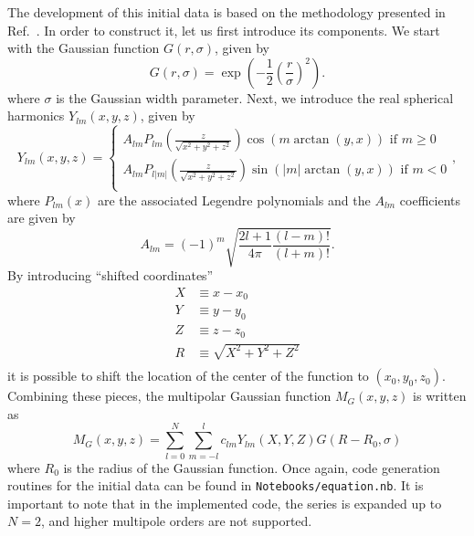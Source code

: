 The development of this initial data is based on the methodology presented in Ref.~\cite{PhysRevD.87.043513}. In order to construct it, let us first introduce its components. We start with the Gaussian function $G(r, \sigma)$, given by
%
\begin{equation}
  G(r, \sigma) = \exp\left( -\frac{1}{2} \left( \frac{r}{\sigma} \right)^2  \right).
  \label{eq:wave_scattering_gaussian}
\end{equation}
%
where $\sigma$ is the Gaussian width parameter. Next, we introduce the real spherical harmonics $Y_{lm}(x,y,z)$, given by
%
\begin{equation}
  Y_{lm}(x, y, z) =
  \begin{cases}
    A_{lm} P_{lm}\left( \frac{z}{\sqrt{x^2 + y^2 + z^2}} \right) \cos(m \arctan(y,x)) \text{ if } m \geq 0  \\
    A_{lm} P_{l|m|}\left( \frac{z}{\sqrt{x^2 + y^2 + z^2}} \right) \sin(|m| \arctan(y,x)) \text{ if } m < 0 \\
  \end{cases}
  ,
  \label{eq:wave_scattering_real_spherical_harmonics}
\end{equation}
%
where $P_{lm}(x)$ are the associated Legendre polynomials and the $A_{lm}$ coefficients are given by
%
\begin{equation}
  A_{lm} = (-1)^m \sqrt{\frac{2 l + 1}{4\pi} \frac{(l-m)!}{(l+m)!}}.
  \label{eq:wave_scattering_real_spherical_harmonics_coeffs}
\end{equation}
%
By introducing ``shifted coordinates''
%
\begin{align}
  X & \equiv x - x_0 \label{eq:wave_scattering_real_spherical_harmonics_shifted_x}                \\
  Y & \equiv y - y_0 \label{eq:wave_scattering_real_spherical_harmonics_shifted_y}                \\
  Z & \equiv z - z_0 \label{eq:wave_scattering_real_spherical_harmonics_shifted_z}                \\
  R & \equiv \sqrt{X^2 + Y^2 + Z^2} \label{eq:wave_scattering_real_spherical_harmonics_shifted_r} \\
\end{align}
%
it is possible to shift the location of the center of the function to $(x_0,y_0,z_0)$. Combining these pieces, the multipolar Gaussian function $M_G(x,y,z)$ is written as
%
\begin{equation}
  M_G(x, y, z) = \sum_{l=0}^{N}\sum_{m = -l}^{l} c_{l m} Y_{l m}(X,Y,Z) G(R-R_0,\sigma)
  \label{eq:wave_scattering_multipolar_gaussian}
\end{equation}
%
where $R_0$ is the radius of the Gaussian function. Once again, code generation routines for the initial data can be found in \texttt{Notebooks/equation.nb}. It is important to note that in the implemented code, the series is expanded up to $N = 2$, and higher multipole orders are not supported.

